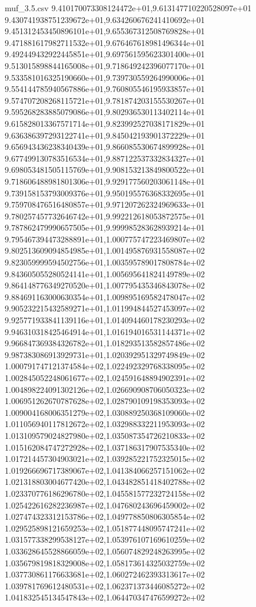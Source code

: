 \begin{filecontents*}{muf_3.5.csv}
9.410170073308124472e+01,9.613147710220528097e+01
9.430741938751239672e+01,9.634260676241410692e+01
9.451312453450896101e+01,9.655367312508769828e+01
9.471881617982711532e+01,9.676467618981496344e+01
9.492449432922445851e+01,9.697561595623301400e+01
9.513015898844165008e+01,9.718649242396077170e+01
9.533581016325190660e+01,9.739730559264990006e+01
9.554144785940567886e+01,9.760805546195933857e+01
9.574707208268115721e+01,9.781874203155530267e+01
9.595268283885079086e+01,9.802936530113402114e+01
9.615828013367571714e+01,9.823992527038171829e+01
9.636386397293122741e+01,9.845042193901372229e+01
9.656943436238340439e+01,9.866085530674899928e+01
9.677499130783516534e+01,9.887122537332834327e+01
9.698053481505115769e+01,9.908153213849800522e+01
9.718606488981801306e+01,9.929177560203061148e+01
9.739158153793009376e+01,9.950195576368332695e+01
9.759708476516480857e+01,9.971207262324969633e+01
9.780257457732646742e+01,9.992212618053872575e+01
9.787862479990657505e+01,9.999985283628939214e+01
9.795467394473288891e+01,1.000775747223469807e+02
9.802513609094854985e+01,1.001495876931558087e+02
9.823059999594502756e+01,1.003595789017808784e+02
9.843605055280524141e+01,1.005695641824149789e+02
9.864148776349270520e+01,1.007795435346843078e+02
9.884691163000630354e+01,1.009895169582478047e+02
9.905232215432589271e+01,1.011994844527453097e+02
9.925771933841139116e+01,1.014094460178230293e+02
9.946310318425464914e+01,1.016194016531144371e+02
9.966847369384326782e+01,1.018293513582857486e+02
9.987383086913929731e+01,1.020392951329749849e+02
1.000791747121374584e+02,1.022492329768338095e+02
1.002845052248061677e+02,1.024591648894902391e+02
1.004898224091302126e+02,1.026690908706050323e+02
1.006951262670787628e+02,1.028790109198353093e+02
1.009004168006351279e+02,1.030889250368109060e+02
1.011056940117812672e+02,1.032988332211953093e+02
1.013109579024827980e+02,1.035087354726210833e+02
1.015162084747272928e+02,1.037186317907535340e+02
1.017214457304903021e+02,1.039285221752325015e+02
1.019266696717389067e+02,1.041384066257151062e+02
1.021318803004677420e+02,1.043482851418402788e+02
1.023370776186296780e+02,1.045581577232724158e+02
1.025422616282236987e+02,1.047680243696459002e+02
1.027474323312153786e+02,1.049778850806305854e+02
1.029525898121659253e+02,1.051877448095747241e+02
1.031577338299538127e+02,1.053976107169610259e+02
1.033628645528866059e+02,1.056074829248263995e+02
1.035679819818329008e+02,1.058173614325032759e+02
1.037730861176633681e+02,1.060272462393313617e+02
1.039781769612480531e+02,1.062371373446085272e+02
1.041832545134547843e+02,1.064470347476599272e+02

\end{filecontents*}
